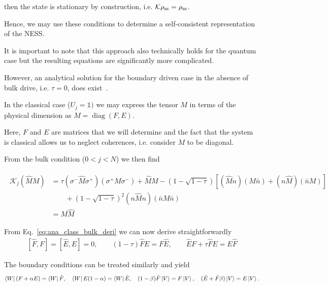 \documentclass[aps,prl,twocolumn,groupedaddress,superscriptaddress,colorlinks,bookmarks=false,citecolor=darkspringgreen,linkcolor=darkolivegreen,urlcolor=navyblue]{revtex4-1}
\begin{document}
then the state is stationary by construction, i.e. $\mathcal{K} \rho_{\rm ss} = \rho_{\rm ss}$.

Hence, we may use these conditions to determine a self-consistent representation of the NESS.

It is important to note that this approach also technically holds for the quantum case but the resulting equations are significantly more complicated.

However, an analytical solution for the boundary driven case in the absence of bulk drive, i.e. $\tau=0$, does exist~\cite{Prosen11}.

In the classical case ($U_j = \mathds{1})$ we may express the tensor $M$ in terms of the physical dimension as $M = \operatorname{diag}(F, E)$.

Here, $F$ and $E$ are matrices that we will determine and the fact that the system is classical allows us to neglect coherences, i.e. consider $M$ to be diagonal.

From the bulk condition ($0<j<N$) we then find

\begin{align} \label{eq:ana_class_bulk_deri}
\begin{split}
    \mathcal{K}_j (\hat{M} M)
    &=\tau (\sigma^-\hat{M}\sigma^+)   (\sigma^+ M \sigma^-)
    +  \hat{M} M
    -(1-\sqrt{1-\tau}) \left[ (\hat{M}n) (M  \bar{n})
    +(n  \hat{M}) (\bar{n} M)
    \right]\\
    &\qquad+ (1-\sqrt{1-\tau})^2 (n\hat{M}n) (\bar{n} M \bar{n})\\
    &= M \hat{M}
\end{split}
\end{align}


From Eq.~\eqref{eq:ana_class_bulk_deri} we can now derive straightforwardly
\begin{align} \label{eq:ana_class_bulk}
     [\hat{F},F] = [\hat{E},E] = 0, \qquad
     (1-\tau) \hat{F} E  = F\hat{E}, \qquad
     \hat{E}F + \tau \hat{F} E = E \hat{F}
\end{align}


The boundary conditions can be treated similarly and yield
\begin{align}
    \label{eq:ana_class_bc}
    \bra{W}(F+\alpha E)=\bra{W}\hat{F}, \quad
     \bra{W} E (1-\alpha) = \bra{W} \hat E, \quad
     (1-\beta)\hat F\ket{V} = F\ket{V},\quad
     (\hat E + \hat F \beta)\ket{V} = E\ket{V}.
 \end{align}
\end{document}
